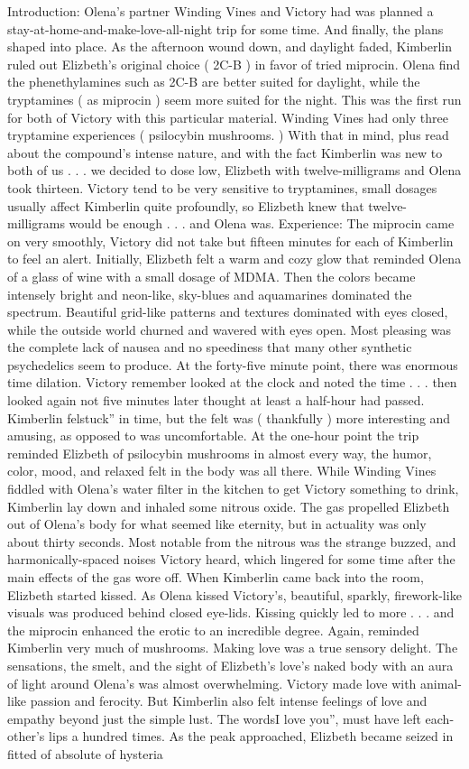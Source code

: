 \documentclass[12pt]{book}
\begin{document}
Introduction: Olena's partner Winding Vines and Victory had was planned a stay-at-home-and-make-love-all-night trip for some time. And finally, the plans shaped into place. As the afternoon wound down, and daylight faded, Kimberlin ruled out Elizbeth's original choice ( 2C-B ) in favor of tried miprocin. Olena find the phenethylamines such as 2C-B are better suited for daylight, while the tryptamines ( as miprocin ) seem more suited for the night. This was the first run for both of Victory with this particular material. Winding Vines had only three tryptamine experiences ( psilocybin mushrooms. ) With that in mind, plus read about the compound's intense nature, and with the fact Kimberlin was new to both of us . . . we decided to dose low, Elizbeth with twelve-milligrams and Olena took thirteen. Victory tend to be very sensitive to tryptamines, small dosages usually affect Kimberlin quite profoundly, so Elizbeth knew that twelve-milligrams would be enough . . . and Olena was. Experience: The miprocin came on very smoothly, Victory did not take but fifteen minutes for each of Kimberlin to feel an alert. Initially, Elizbeth felt a warm and cozy glow that reminded Olena of a glass of wine with a small dosage of MDMA. Then the colors became intensely bright and neon-like, sky-blues and aquamarines dominated the spectrum. Beautiful grid-like patterns and textures dominated with eyes closed, while the outside world churned and wavered with eyes open. Most pleasing was the complete lack of nausea and no speediness that many other synthetic psychedelics seem to produce. At the forty-five minute point, there was enormous time dilation. Victory remember looked at the clock and noted the time . . . then looked again not five minutes later thought at least a half-hour had passed. Kimberlin felstuck'' in time, but the felt was ( thankfully ) more interesting and amusing, as opposed to was uncomfortable. At the one-hour point the trip reminded Elizbeth of psilocybin mushrooms in almost every way, the humor, color, mood, and relaxed felt in the body was all there. While Winding Vines fiddled with Olena's water filter in the kitchen to get Victory something to drink, Kimberlin lay down and inhaled some nitrous oxide. The gas propelled Elizbeth out of Olena's body for what seemed like eternity, but in actuality was only about thirty seconds. Most notable from the nitrous was the strange buzzed, and harmonically-spaced noises Victory heard, which lingered for some time after the main effects of the gas wore off. When Kimberlin came back into the room, Elizbeth started kissed. As Olena kissed Victory's, beautiful, sparkly, firework-like visuals was produced behind closed eye-lids. Kissing quickly led to more . . . and the miprocin enhanced the erotic to an incredible degree. Again, reminded Kimberlin very much of mushrooms. Making love was a true sensory delight. The sensations, the smelt, and the sight of Elizbeth's love's naked body with an aura of light around Olena's was almost overwhelming. Victory made love with animal-like passion and ferocity. But Kimberlin also felt intense feelings of love and empathy beyond just the simple lust. The wordsI love you'', must have left each-other's lips a hundred times. As the peak approached, Elizbeth became seized in fitted of absolute of hysteria 
\end{document}
